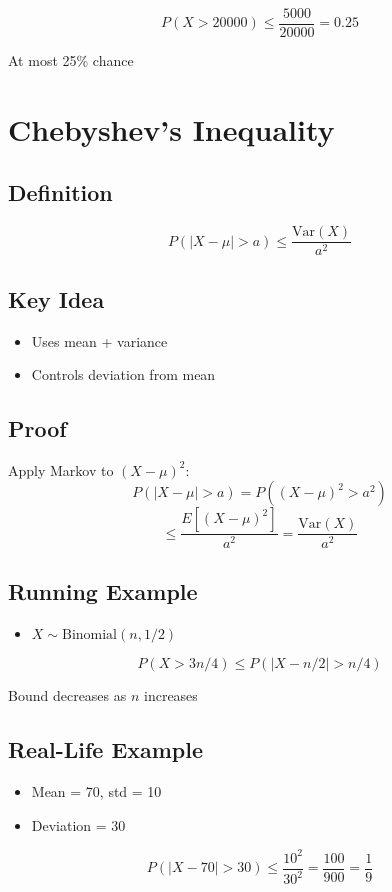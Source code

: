 \documentclass[11pt]{article}
\begin{document}
\[
P(X > 20000) \leq \frac{5000}{20000} = 0.25
\]

At most 25\% chance

\section{Chebyshev's Inequality}

\subsection{Definition}
\[
P(|X - \mu| > a) \leq \frac{\text{Var}(X)}{a^2}
\]

\subsection{Key Idea}
\begin{itemize}
\item Uses mean + variance
\item Controls deviation from mean
\end{itemize}

\subsection{Proof}
Apply Markov to $(X - \mu)^2$:
\[
P(|X - \mu| > a) = P((X - \mu)^2 > a^2)
\]
\[
\leq \frac{E[(X - \mu)^2]}{a^2} = \frac{\text{Var}(X)}{a^2}
\]

\subsection{Running Example}
\begin{itemize}
\item $X \sim \text{Binomial}(n, 1/2)$
\end{itemize}

\[
P(X > 3n/4) \leq P(|X - n/2| > n/4)
\]

Bound decreases as $n$ increases

\subsection{Real-Life Example}
\begin{itemize}
\item Mean = 70, std = 10
\item Deviation = 30
\end{itemize}

\[
P(|X - 70| > 30) \leq \frac{10^2}{30^2} = \frac{100}{900} = \frac{1}{9}
\]
\end{document}
